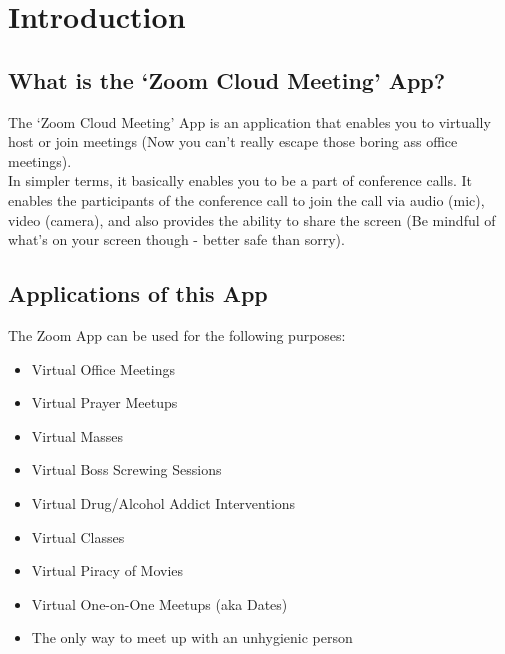 \documentclass[14pt]{report}
\newcommand{\changefont}{
    \fontsize{10}{10}\selectfont
}
\renewcommand{\headrulewidth}{2pt}
\renewcommand{\footrulewidth}{0.4pt}
\begin{document}
    \newpage

    \renewcommand{\footrulewidth}{0.4pt}



    \fancyfoot[R]{\changefont Page \thepage}
    
    \fancypagestyle{plain}{%
		\fancyhf{}%
		\fancyfoot[R]{Page \thepage}%
		\renewcommand{\headrulewidth}{0pt}%
		\renewcommand{\footrulewidth}{0.4pt}%
		}
    
    \chapter{Introduction}\label{chapter1}
		

        \section{What is the `Zoom Cloud Meeting' App?}
            The `Zoom Cloud Meeting' App is an application that enables you to virtually host or join meetings (Now you can't really escape those boring ass office meetings).\\

            In simpler terms, it basically enables you to be a part of conference calls. It enables the participants of the conference call to join the call via audio (mic), video (camera), and also provides the ability to share the screen (Be mindful of what's on your screen though - better safe than sorry).\\

        \section{Applications of this App}
            The Zoom App can be used for the following purposes:
            \begin{itemize}
                \item Virtual Office Meetings
                \item Virtual Prayer Meetups 
                \item Virtual Masses
                \item Virtual Boss Screwing Sessions
                \item Virtual Drug/Alcohol Addict Interventions
                \item Virtual Classes
                \item Virtual Piracy of Movies
                \item Virtual One-on-One Meetups (aka Dates)
                \item The only way to meet up with an unhygienic person
            \end{itemize}
\end{document}
